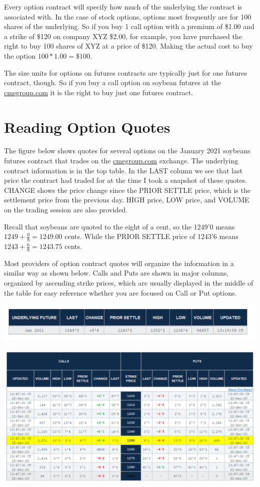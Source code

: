 \documentclass[
]{book}
\begin{document}
Every option contract will specify how much of the underlying the contract is associated with. In the case of stock options, options most frequently are for 100 shares of the underlying. So if you buy 1 call option with a premium of \$1.00 and a strike of \$120 on company XYZ \$2.00, for example, you have purchased the right to buy 100 shares of XYZ at a price of \$120. Making the actual cost to buy the option \(100*1.00 = \$100\).

The size units for options on futures contracts are typically just for one futures contract, though. So if you buy a call option on soybean futures at the \url{cmegroup.com} it is the right to buy just one futures contract.

\hypertarget{reading-option-quotes}{%
\section{Reading Option Quotes}\label{reading-option-quotes}}

The figure below shows quotes for several options on the January 2021 soybeans futures contract that trades on the \url{cmegroup.com} exchange. The underlying contract information is in the top table. In the LAST column we see that last price the contract had traded for at the time I took a snapshot of these quotes. CHANGE shows the price change since the PRIOR SETTLE price, which is the settlement price from the previous day. HIGH price, LOW price, and VOLUME on the trading session are also provided.

Recall that soybeans are quoted to the eight of a cent, so the 1249'0 means \(1249 + \frac{0}{8} = 1249.00\) cents. While the PRIOR SETTLE price of 1243'6 means \(1243 + \frac{6}{8} = 1243.75\) cents.

Most providers of option contract quotes will organize the information in a similar way as shown below. Calls and Puts are shown in major columns, organized by ascending strike prices, which are usually displayed in the middle of the table for easy reference whether you are focused on Call or Put options.

\includegraphics{assets/Options1-undelyingquote.PNG}

\href{https://www.cmegroup.com/trading/agricultural/grain-and-oilseed/soybean_contract_specifications.html}{\includegraphics{assets/Options1-quotes.PNG}}
\end{document}
